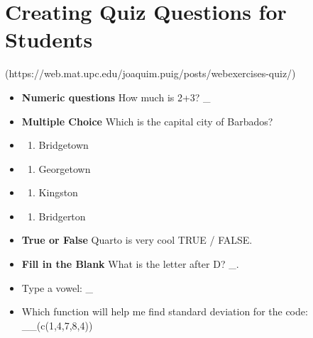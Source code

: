 \documentclass[
  letterpaper,
  DIV=11,
  numbers=noendperiod]{scrreprt}
\providecommand{\tightlist}{%
  \setlength{\itemsep}{0pt}\setlength{\parskip}{0pt}}
\begin{document}
\section*{Creating Quiz Questions for
Students}\label{creating-quiz-questions-for-students}


(https://web.mat.upc.edu/joaquim.puig/posts/webexercises-quiz/)

\begin{itemize}
\item
  \textbf{Numeric questions} How much is 2+3? \_
\item
  \textbf{Multiple Choice} Which is the capital city of Barbados?
\item
  \begin{enumerate}
  \def\labelenumi{(\Alph{enumi})}
  \tightlist
  \item
    Bridgetown\\
  \end{enumerate}
\item
  \begin{enumerate}
  \def\labelenumi{(\Alph{enumi})}
  \setcounter{enumi}{1}
  \tightlist
  \item
    Georgetown\\
  \end{enumerate}
\item
  \begin{enumerate}
  \def\labelenumi{(\Alph{enumi})}
  \setcounter{enumi}{2}
  \tightlist
  \item
    Kingston\\
  \end{enumerate}
\item
  \begin{enumerate}
  \def\labelenumi{(\Alph{enumi})}
  \setcounter{enumi}{3}
  \tightlist
  \item
    Bridgerton
  \end{enumerate}
\item
  \textbf{True or False} Quarto is very cool TRUE / FALSE.
\item
  \textbf{Fill in the Blank} What is the letter after D? \_.
\item
  Type a vowel: \_
\item
  Which function will help me find standard deviation for the code:
  \_\_(c(1,4,7,8,4))
\end{itemize}
\end{document}

